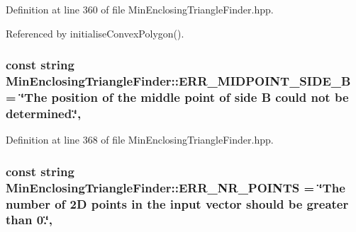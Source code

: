 Definition at line 360 of file Min\-Enclosing\-Triangle\-Finder.\-hpp.



Referenced by initialise\-Convex\-Polygon().

\hypertarget{classmultiscale_1_1MinEnclosingTriangleFinder_a39758a67f9d66d46f128f23fa7027d68}{
\subsubsection[{E\-R\-R\-\_\-\-M\-I\-D\-P\-O\-I\-N\-T\-\_\-\-S\-I\-D\-E\-\_\-\-B}]{\setlength{\rightskip}{0pt plus 5cm}const string Min\-Enclosing\-Triangle\-Finder\-::\-E\-R\-R\-\_\-\-M\-I\-D\-P\-O\-I\-N\-T\-\_\-\-S\-I\-D\-E\-\_\-\-B = \char`\"{}The position of the middle point of side B could not be determined.\char`\"{}\hspace{0.3cm}{\ttfamily [static]}, {\ttfamily [private]}}}\label{classmultiscale_1_1MinEnclosingTriangleFinder_a39758a67f9d66d46f128f23fa7027d68}


Definition at line 368 of file Min\-Enclosing\-Triangle\-Finder.\-hpp.

\hypertarget{classmultiscale_1_1MinEnclosingTriangleFinder_af42f92155e17b69fc5b309dfcf160ad7}{
\subsubsection[{E\-R\-R\-\_\-\-N\-R\-\_\-\-P\-O\-I\-N\-T\-S}]{\setlength{\rightskip}{0pt plus 5cm}const string Min\-Enclosing\-Triangle\-Finder\-::\-E\-R\-R\-\_\-\-N\-R\-\_\-\-P\-O\-I\-N\-T\-S = \char`\"{}The number of 2\-D points in the input vector should be greater than 0.\char`\"{}\hspace{0.3cm}{\ttfamily [static]}, {\ttfamily [private]}}}\label{classmultiscale_1_1MinEnclosingTriangleFinder_af42f92155e17b69fc5b309dfcf160ad7}


